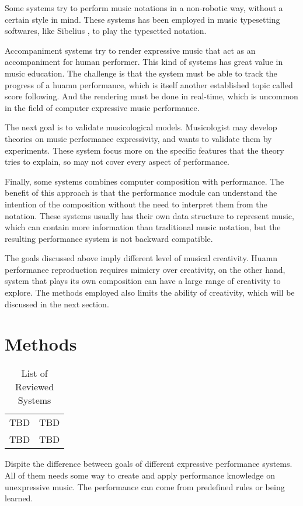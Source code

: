 Some systems try to perform music notations in a non-robotic way, without a certain style in mind. These systems has been employed in music typesetting softwares, like Sibelius \cite{sibelius}, to play the typesetted notation. 

Accompaniment systems try to render expressive music that act as an accompaniment for human performer. This kind of systems has great value in music education. The challenge is that the system must be able to track the progress of a huamn performance, which is itself another established topic called score following. And the rendering must be done in real-time, which is uncommon in the field of computer expressive music performance.

The next goal is to validate musicological models. Musicologist may develop theories on music performance expressivity, and wants to validate them by experiments. These system focus more on the specific features that the theory tries to explain, so may not cover every aspect of performance.

Finally, some systems combines computer composition with performance. The benefit of this approach is that the performance module can understand the intention of the composition without the need to interpret them from the notation. These systems usually has their own data structure to represent music, which can contain more information than traditional music notation, but the resulting performance system is not backward compatible.

The goals discussed above imply different level of musical creativity. Huamn performance reproduction requires mimicry over creativity, on the other hand, system that plays its own composition can have a large range of creativity to explore. The methods employed also limits the ability of creativity, which will be discussed in the next section.


\section{Methods}
\begin{table}
   \centering
   \begin{tabular}{|c|c|}
      TBD & TBD\\
      TBD & TBD\\
   \end{tabular}
   \caption{List of Reviewed Systems}
   \label{tab:prevworks}
\end{table}
Dispite the difference between goals of different expressive performance systems. All of them needs some way to create and apply performance knowledge on unexpressive music. The performance can come from predefined rules or being learned. 

